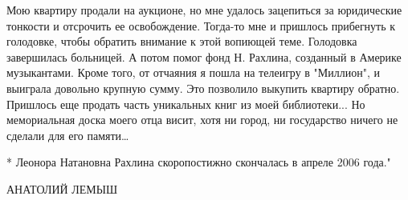 Мою квартиру продали на аукционе, но мне удалось зацепиться за юридические
тонкости и отсрочить ее освобождение. Тогда-то мне и пришлось прибегнуть к
голодовке, чтобы обратить внимание к этой вопиющей теме. Голодовка завершилась
больницей. А потом помог фонд Н. Рахлина, созданный в Америке музыкантами.
Кроме того, от отчаяния я пошла на телеигру в "Миллион", и выиграла довольно
крупную сумму. Это позволило выкупить квартиру обратно. Пришлось еще продать
часть уникальных книг из моей библиотеки... Но мемориальная доска моего отца
висит, хотя ни город, ни государство ничего не сделали для его памяти…

* Леонора Натановна Рахлина скоропостижно скончалась в апреле 2006 года."

АНАТОЛИЙ ЛЕМЫШ

